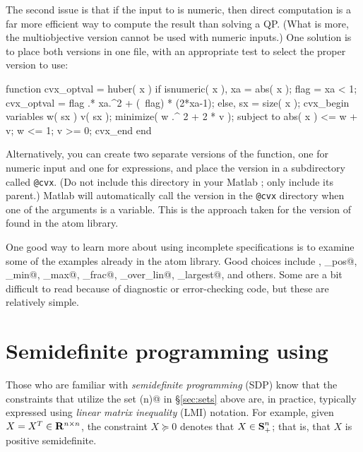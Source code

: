 \documentclass[12pt]{article}
\newcommand{\symm}{{\mbox{\bf S}}}  %
\begin{document}
The second issue is that if the input to \verb@huber@ is numeric, then
direct computation is a far more efficient way to compute the result
than solving a QP. (What is more, the multiobjective version
cannot be used with numeric inputs.) One solution is to place 
both versions in one file, with an appropriate test to select
the proper version to use:
\begin{code}
	function cvx_optval = huber( x )
	if isnumeric( x ),
	    xa   = abs( x );
	    flag = xa < 1;
	    cvx_optval = flag .* xa.^2 + (~flag) * (2*xa-1);
	else,
	    sx = size( x );
	    cvx_begin
	        variables w( sx ) v( sx );
	        minimize( w .^ 2 + 2 * v );
	        subject to
	            abs( x ) <= w + v;
	            w <= 1; v >= 0;
	    cvx_end
	end
\end{code}
Alternatively, you can create two separate versions of the function, one 
for numeric input and one for \cvx expressions, and 
place the \cvx version in a subdirectory called
\verb+@cvx+. (Do not include this directory in your Matlab \verb@path@;
only include its parent.) Matlab will automatically call the version in the 
\verb+@cvx+ directory when one of the arguments is a \cvx variable.
This is the approach taken for the version of \verb@huber@ found in the \cvx
atom library.

One good way to learn more about using incomplete specifications is to
examine some of the examples already in the \cvx atom library. 
Good choices include \verb@huber@, \verb@inv_pos@, \verb@lambda_min@,
\verb@lambda_max@, \verb@matrix_frac@, \verb@quad_over_lin@,
\verb@sum_largest@, and others. Some are
a bit difficult to read because of diagnostic or error-checking code,
but these are relatively simple.

\newpage
\section{Semidefinite programming using \cvx}
\label{sec:sdpmode}

Those who are familiar with \emph{semidefinite
programming} (SDP) know that the constraints that utilize
the set \verb@semidefinite(n)@ in \S\ref{sec:sets} above are, in practice, typically
expressed using \emph{linear matrix inequality} (LMI) notation. 
For example, given $X=X^T\in\mathbf{R}^{{n}\times{n}}$, the
constraint $X\succeq 0$ denotes that $X\in\symm^n_+$; that is, that
$X$ is positive semidefinite.
\end{document}
